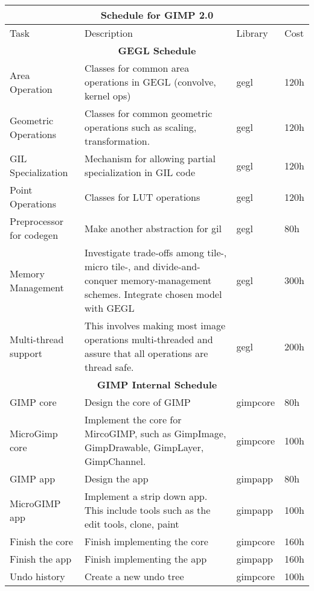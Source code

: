 \begin{flushleft}		
\begin{tabular}{|p{3cm}|p{4.5cm}|p{2cm}|l|}\hline
\multicolumn{4}{|c|}{\rule[-3mm]{0mm}{8mm} \large \bf Schedule for GIMP 2.0}\\  
\hline
Task & Description & Library & Cost\\ 
\hline 

\multicolumn{4}{|c|}{\bf GEGL Schedule}\\
\hline
Area Operation & Classes for common area operations in GEGL (convolve, kernel ops) & gegl & 120h\\
\hline
Geometric Operations & Classes for common geometric operations such as scaling, transformation. & gegl & 120h\\
\hline
GIL Specialization & Mechanism for allowing partial specialization in GIL code & gegl & 120h\\
\hline
Point Operations & Classes for LUT operations & gegl & 120h\\
\hline
Preprocessor for codegen & Make another abstraction for gil & gegl & 80h\\
\hline
Memory Management & Investigate trade-offs among tile-, micro tile-, and divide-and-conquer memory-management schemes. Integrate chosen model with GEGL & gegl & 300h\\
\hline
Multi-thread support & This involves making most image operations multi-threaded and assure that all operations are thread safe. & gegl & 200h\\  
\hline

\multicolumn{4}{|c|}{\bf GIMP Internal Schedule}\\
\hline 
GIMP core & Design the core of GIMP & gimpcore & 80h\\
\hline 
MicroGimp core & Implement the core for MircoGIMP, such as GimpImage, GimpDrawable, GimpLayer, GimpChannel. & gimpcore & 100h\\
\hline
GIMP app & Design the app & gimpapp & 80h\\
\hline 
MicroGIMP app & Implement a strip down app. This include tools such as the edit tools, clone, paint & gimpapp & 100h\\
\hline 
Finish the core & Finish implementing the core & gimpcore & 160h\\
\hline
Finish the app & Finish implementing the app & gimpapp & 160h\\
\hline 
Undo history & Create a new undo tree & gimpcore & 100h\\
\hline


\end{tabular}
\end{flushleft}
